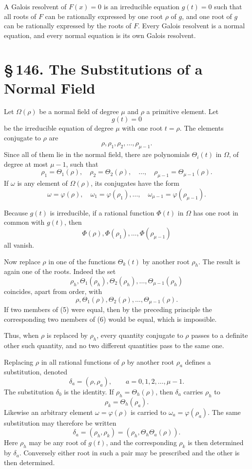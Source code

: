 \documentclass[11pt]{article}
\providecommand{\sect}[2]{\section*{\S\,#1. #2}}
\begin{document}
A Galois resolvent of $F(x)=0$ is an irreducible equation $g(t)=0$ such that all roots of $F$ can be rationally expressed by one root $\rho$ of $g$, and one root of $g$ can be rationally expressed by the roots of $F$. Every Galois resolvent is a normal equation, and every normal equation is its own Galois resolvent.

\sect{146}{The Substitutions of a Normal Field}

Let $\Omega(\rho)$ be a normal field of degree $\mu$ and $\rho$ a primitive element. Let
\[
\tag{1}
        g(t)=0
\]
be the irreducible equation of degree $\mu$ with one root $t=\rho$. The elements conjugate to $\rho$ are
\[
\tag{2}
        \rho,\rho_1,\rho_2,\ldots,\rho_{\mu-1}.
\]
Since all of them lie in the normal field, there are polynomials $\Theta_i(t)$ in $\Omega$, of degree at most $\mu-1$, such that
\[
\tag{3}
        \rho_1=\Theta_1(\rho),\quad
        \rho_2=\Theta_2(\rho),\quad\ldots,\quad
        \rho_{\mu-1}=\Theta_{\mu-1}(\rho).
\]
If $\omega$ is any element of $\Omega(\rho)$, its conjugates have the form
\[
\tag{4}
        \omega=\varphi(\rho),\quad
        \omega_1=\varphi(\rho_1),\ldots,\quad
        \omega_{\mu-1}=\varphi(\rho_{\mu-1}).
\]

Because $g(t)$ is irreducible, if a rational function $\Phi(t)$ in $\Omega$ has one root in common with $g(t)$, then
\[
        \Phi(\rho),\Phi(\rho_1),\ldots,\Phi(\rho_{\mu-1})
\]
all vanish.

Now replace $\rho$ in one of the functions $\Theta_k(t)$ by another root $\rho_h$. The result is again one of the roots. Indeed the set
\[
\tag{5}
        \rho_h,\Theta_1(\rho_h),\Theta_2(\rho_h),\ldots,\Theta_{\mu-1}(\rho_h)
\]
coincides, apart from order, with
\[
\tag{6}
        \rho,\Theta_1(\rho),\Theta_2(\rho),\ldots,\Theta_{\mu-1}(\rho).
\]
If two members of (5) were equal, then by the preceding principle the corresponding two members of (6) would be equal, which is impossible.

Thus, when $\rho$ is replaced by $\rho_h$, every quantity conjugate to $\rho$ passes to a definite other such quantity, and no two different quantities pass to the same one.

Replacing $\rho$ in all rational functions of $\rho$ by another root $\rho_a$ defines a substitution, denoted
\[
        \delta_a=(\rho,\rho_a),\qquad a=0,1,2,\ldots,\mu-1.
\]
The substitution $\delta_0$ is the identity. If $\rho_h=\Theta_h(\rho)$, then $\delta_a$ carries $\rho_h$ to
\[
        \rho_k=\Theta_h(\rho_a).
\]
Likewise an arbitrary element $\omega=\varphi(\rho)$ is carried to $\omega_a=\varphi(\rho_a)$. The same substitution may therefore be written
\[
\tag{9}
        \delta_a=(\rho_h,\rho_k)=(\rho_h,\Theta_h\Theta_a(\rho)).
\]
Here $\rho_h$ may be any root of $g(t)$, and the corresponding $\rho_k$ is then determined by $\delta_a$. Conversely either root in such a pair may be prescribed and the other is then determined.
\end{document}
